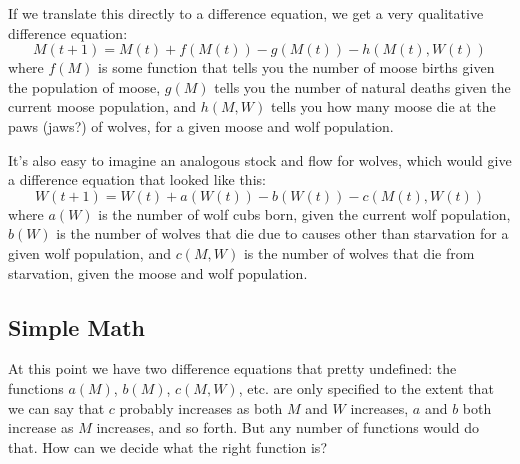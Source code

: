 \documentclass{tufte-handout}
\begin{document}
If we translate this directly to a difference equation, we get a very qualitative difference equation:
$$M(t+1) = M(t) + f(M(t)) - g(M(t)) - h(M(t),W(t))$$
where $f(M)$ is some function that tells you the number of moose births given the population of moose, $g(M)$ tells you the number of natural deaths given the current moose population, and $h(M,W)$ tells you how many moose die at the paws (jaws?) of wolves, for a given moose and wolf population.

It's also easy to imagine an analogous stock and flow for wolves, which would give a difference equation that looked like this:
$$W(t+1) = W(t) + a(W(t)) - b(W(t)) - c(M(t), W(t))$$
where $a(W)$ is the number of wolf cubs born, given the current wolf population, $b(W)$ is the number of wolves that die due to causes other than starvation for a given wolf population, and $c(M,W)$ is the number of wolves that die from starvation, given the moose and wolf population.

\subsection{Simple Math}

At this point we have two difference equations that pretty undefined:  the functions $a(M)$, $b(M)$, $c(M,W)$, etc. are only specified to the extent that we can say that $c$ probably increases as both $M$ and $W$ increases, $a$ and $b$ both increase as $M$ increases, and so forth.  But any number of functions would do that.  How can we decide what the right function is?
\end{document}

